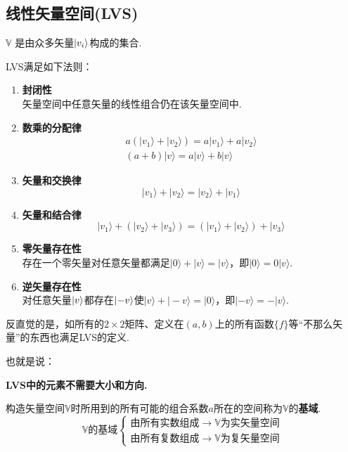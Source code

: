 \subsection{线性矢量空间(LVS)}
\begin{definition}
     $\mathbb{V}$ 是由众多矢量$\ket{v_i}$构成的集合.
\end{definition}
LVS满足如下法则：
\begin{enumerate}
    \item \textbf{封闭性} \\
    矢量空间中任意矢量的线性组合仍在该矢量空间中.
    \item \textbf{数乘的分配律}
    \begin{gather*}
        a ( |v_1\rangle + |v_2\rangle ) = a |v_1\rangle + a |v_2\rangle \\
        (a + b) |v\rangle = a |v\rangle + b |v\rangle
    \end{gather*}
    \item \textbf{矢量和交换律}
    \[|v_1\rangle + |v_2\rangle = |v_2\rangle + |v_1\rangle\]
    \item \textbf{矢量和结合律}
    \[|v_1\rangle + ( |v_2\rangle + |v_3\rangle ) = ( |v_1\rangle + |v_2\rangle ) + |v_3\rangle\]
    \item \textbf{零矢量存在性} \\
    存在一个零矢量对任意矢量都满足$|0\rangle + |v\rangle = |v\rangle$，即$|0\rangle = 0 |v\rangle$.
    \item \textbf{逆矢量存在性} \\
    对任意矢量$\ket{v}$都存在$\ket{-v}$使$|v\rangle + |-v\rangle = |0\rangle$，即$|-v\rangle = - |v\rangle$.
\end{enumerate}

反直觉的是，如所有的$2\times 2$矩阵、定义在$(a,b)$上的所有函数$\{f\}$等“不那么矢量”的东西也满足LVS的定义.

也就是说：

\textbf{LVS中的元素不需要大小和方向.}

\begin{definition}
    构造矢量空间$\mathbb{V}$时所用到的所有可能的组合系数$a$所在的空间称为$\mathbb{V}$的\textbf{基域}.
    \[
    \mathbb{V}\text{的基域}
    \begin{cases}
        \text{由所有实数组成} \rightarrow \mathbb{V}\text{为实矢量空间} \\
        \text{由所有复数组成} \rightarrow \mathbb{V}\text{为复矢量空间}
    \end{cases}
    \]
\end{definition}


